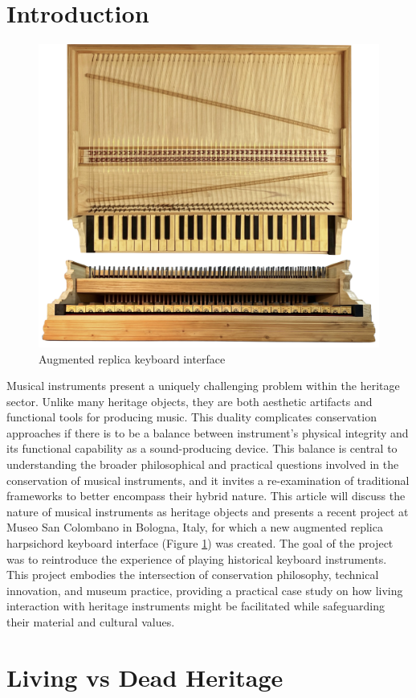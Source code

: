 \section{Introduction}

\begin{figure}
    \centering
    \includegraphics[width=0.6\linewidth]{img/49-key-front-top.png}
    \caption{Augmented replica keyboard interface}
    \label{fig:49-key}
\end{figure}

Musical instruments present a uniquely challenging problem within the heritage sector. Unlike many heritage objects, they are both aesthetic artifacts and functional tools for producing music. This duality complicates conservation approaches if there is to be a balance between instrument's physical integrity and its functional capability as a sound-producing device. This balance is central to understanding the broader philosophical and practical questions involved in the conservation of musical instruments, and it invites a re-examination of traditional frameworks to better encompass their hybrid nature. This article will discuss the nature of musical instruments as heritage objects and presents a recent project at Museo San Colombano in Bologna, Italy, for which a new augmented replica harpsichord keyboard interface (Figure \ref{fig:49-key}) was created. The goal of the project was to reintroduce the experience of playing historical keyboard instruments. This project embodies the intersection of conservation philosophy, technical innovation, and museum practice, providing a practical case study on how living interaction with heritage instruments might be facilitated while safeguarding their material and cultural values.

\section{Living vs Dead Heritage}

